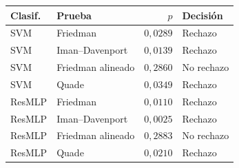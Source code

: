 \begin{resulttable}
\centering\fontsize{8}{10}\selectfont\setlength{\tabcolsep}{3.0pt}
\caption{Pruebas globales por clasificador sobre cinco estrategias y seis datasets con la biblioteca de 22 descriptores. Nivel nominal $\alpha=0{,}05$.}
\label{tab:classifier-global}
\begin{tabular}{@{}llrl@{}}
\toprule
Clasif. & Prueba & $p$ & Decisión \\
\midrule
SVM & Friedman & $0{,}0289$ & Rechazo \\
SVM & Iman--Davenport & $0{,}0139$ & Rechazo \\
SVM & Friedman alineado & $0{,}2860$ & No rechazo \\
SVM & Quade & $0{,}0349$ & Rechazo \\
ResMLP & Friedman & $0{,}0110$ & Rechazo \\
ResMLP & Iman--Davenport & $0{,}0025$ & Rechazo \\
ResMLP & Friedman alineado & $0{,}2883$ & No rechazo \\
ResMLP & Quade & $0{,}0210$ & Rechazo \\
\bottomrule
\end{tabular}
\end{resulttable}
\FloatBarrier
